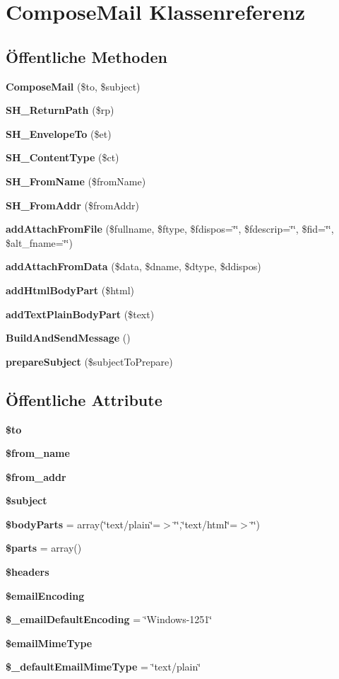 \section{ComposeMail Klassenreferenz}
\label{classComposeMail}
\subsection*{Öffentliche Methoden}
\begin{CompactItemize}
\item 
{\bf ComposeMail} (\$to, \$subject)
\item 
{\bf SH\_\-ReturnPath} (\$rp)
\item 
{\bf SH\_\-EnvelopeTo} (\$et)
\item 
{\bf SH\_\-ContentType} (\$ct)
\item 
{\bf SH\_\-FromName} (\$fromName)
\item 
{\bf SH\_\-FromAddr} (\$fromAddr)
\item 
{\bf addAttachFromFile} (\$fullname, \$ftype, \$fdispos=\char`\"{}\char`\"{}, \$fdescrip=\char`\"{}\char`\"{}, \$fid=\char`\"{}\char`\"{}, \$alt\_\-fname=\char`\"{}\char`\"{})
\item 
{\bf addAttachFromData} (\$data, \$dname, \$dtype, \$ddispos)
\item 
{\bf addHtmlBodyPart} (\$html)
\item 
{\bf addTextPlainBodyPart} (\$text)
\item 
{\bf BuildAndSendMessage} ()
\item 
{\bf prepareSubject} (\$subjectToPrepare)
\end{CompactItemize}
\subsection*{Öffentliche Attribute}
\begin{CompactItemize}
\item 
{\bf \$to}
\item 
{\bf \$from\_\-name}
\item 
{\bf \$from\_\-addr}
\item 
{\bf \$subject}
\item 
{\bf \$bodyParts} = array(\char`\"{}text/plain\char`\"{}=$>$\char`\"{}\char`\"{},\char`\"{}text/html\char`\"{}=$>$\char`\"{}\char`\"{})
\item 
{\bf \$parts} = array()
\item 
{\bf \$headers}
\item 
{\bf \$emailEncoding}
\item 
{\bf \$\_\-emailDefaultEncoding} = \char`\"{}Windows-1251\char`\"{}
\item 
{\bf \$emailMimeType}
\item 
{\bf \$\_\-defaultEmailMimeType} = \char`\"{}text/plain\char`\"{}
\end{CompactItemize}


